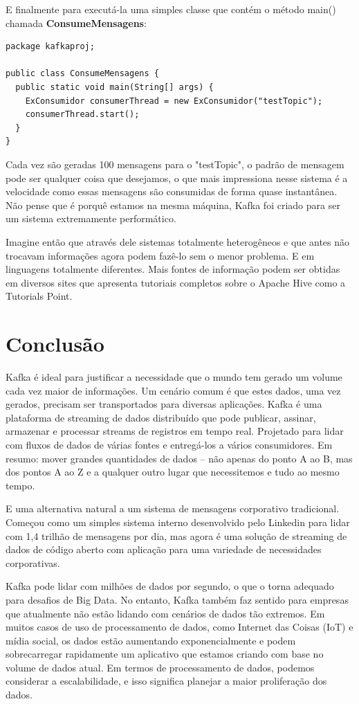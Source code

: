 \documentclass[a4paper,11pt]{article}
\begin{document}
E finalmente para executá-la uma simples classe que contém o método main() chamada \textbf{ConsumeMensagens}:
\begin{lstlisting}[]
package kafkaproj;

public class ConsumeMensagens {
  public static void main(String[] args) {
    ExConsumidor consumerThread = new ExConsumidor("testTopic");
    consumerThread.start();
  }
}
\end{lstlisting}

Cada vez são geradas 100 mensagens para o "testTopic", o padrão de mensagem pode ser qualquer coisa que desejamos, o que mais impressiona nesse sistema é a velocidade como essas mensagens são consumidas de forma quase instantânea. Não pense que é porquê estamos na mesma máquina, Kafka foi criado para ser um sistema extremamente performático. 

Imagine então que através dele sistemas totalmente heterogêneos e que antes não trocavam informações agora podem fazê-lo sem o menor problema. E em linguagens totalmente diferentes. Mais fontes de informação podem ser obtidas em diversos sites que apresenta tutoriais completos sobre o Apache Hive como a Tutorials Point\cite{tutorialspoint}.
	
\section{Conclusão}
Kafka é ideal para justificar a necessidade que o mundo tem gerado um volume cada vez maior de informações. Um cenário comum é que estes dados, uma vez gerados, precisam ser transportados para diversas aplicações. Kafka é uma plataforma de streaming de dados distribuído que pode publicar, assinar, armazenar e processar streams de registros em tempo real. Projetado para lidar com fluxos de dados de várias fontes e entregá-los a vários consumidores. Em resumo: mover grandes quantidades de dados – não apenas do ponto A ao B, mas dos pontos A ao Z e a qualquer outro lugar que necessitemos e tudo ao mesmo tempo.

E uma alternativa natural a um sistema de mensagens corporativo tradicional. Começou como um simples sistema interno desenvolvido pelo Linkedin para lidar com 1,4 trilhão de mensagens por dia, mas agora é uma solução de streaming de dados de código aberto com aplicação para uma variedade de necessidades corporativas. 

Kafka pode lidar com milhões de dados por segundo, o que o torna adequado para desafios de Big Data. No entanto, Kafka também faz sentido para empresas que atualmente não estão lidando com cenários de dados tão extremos. Em muitos casos de uso de processamento de dados, como Internet das Coisas (IoT) e mídia social, os dados estão aumentando exponencialmente e podem sobrecarregar rapidamente um aplicativo que estamos criando com base no volume de dados atual. Em termos de processamento de dados, podemos considerar a escalabilidade, e isso significa planejar a maior proliferação dos dados. 
\end{document}
